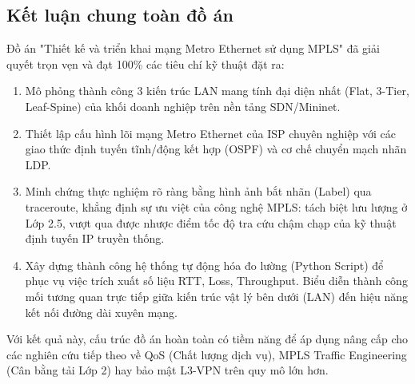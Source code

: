 \subsection{Kết luận chung toàn đồ án}
Đồ án "Thiết kế và triển khai mạng Metro Ethernet sử dụng MPLS" đã giải quyết trọn vẹn và đạt 100\% các tiêu chí kỹ thuật đặt ra:
\begin{enumerate}
    \item Mô phỏng thành công 3 kiến trúc LAN mang tính đại diện nhất (Flat, 3-Tier, Leaf-Spine) của khối doanh nghiệp trên nền tảng SDN/Mininet.
    \item Thiết lập cấu hình lõi mạng Metro Ethernet của ISP chuyên nghiệp với các giao thức định tuyến tĩnh/động kết hợp (OSPF) và cơ chế chuyển mạch nhãn LDP.
    \item Minh chứng thực nghiệm rõ ràng bằng hình ảnh bắt nhãn (Label) qua traceroute, khẳng định sự ưu việt của công nghệ MPLS: tách biệt lưu lượng ở Lớp 2.5, vượt qua được nhược điểm tốc độ tra cứu chậm chạp của kỹ thuật định tuyến IP truyền thống.
    \item Xây dựng thành công hệ thống tự động hóa đo lường (Python Script) để phục vụ việc trích xuất số liệu RTT, Loss, Throughput. Biểu diễn thành công mối tương quan trực tiếp giữa kiến trúc vật lý bên dưới (LAN) đến hiệu năng kết nối đường dài xuyên mạng.
\end{enumerate}

Với kết quả này, cấu trúc đồ án hoàn toàn có tiềm năng để áp dụng nâng cấp cho các nghiên cứu tiếp theo về QoS (Chất lượng dịch vụ), MPLS Traffic Engineering (Cân bằng tải Lớp 2) hay bảo mật L3-VPN trên quy mô lớn hơn.

